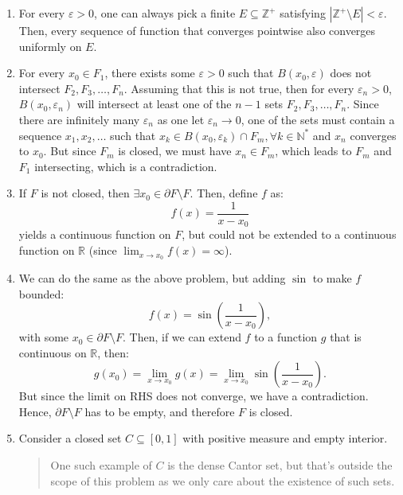 \begin{enumerate}[label=\textbf{2E.\arabic*}]
\item For every \( \varepsilon > 0 \), one can always pick a finite \( E
  \subseteq \mathbb{Z}^{+} \) satisfying \( |\mathbb{Z}^{+} \setminus E| <
  \varepsilon \). Then, every sequence of function that converges pointwise also
  converges uniformly on \( E \).
\item For every \( x_{0} \in F_{1} \), there exists some \( \varepsilon > 0 \)
  such that \( B(x_{0}, \varepsilon) \) does not intersect \( F_{2}, F_{3},
  \ldots , F_{n} \). Assuming that this is not true, then for every \(
  \varepsilon_{n} > 0 \), \( B(x_{0}, \varepsilon_{n}) \) will intersect at
  least one of the \( n-1 \) sets \( F_{2}, F_{3}, \ldots , F_{n} \). Since
  there are infinitely many \( \varepsilon_{n} \) as one let \( \varepsilon_{n}
  \to 0\), one of the sets must contain a sequence \( x_{1}, x_{2}, \ldots  \)
  such that \( x_{k} \in B(x_{0}, \varepsilon_{k}) \cap F_{m}, \forall  k \in
  \mathbb{N}^{*} \) and \( x_{n} \) converges to \( x_{0} \). But since \( F_{m}
  \) is closed, we must have \( x_{n} \in F_{m} \), which leads to \( F_{m} \)
  and \( F_{1} \) intersecting, which is a contradiction.
\item If \( F \) is not closed, then \( \exists x_{0} \in \partial F \setminus F
  \). Then, define \( f \) as:
  \[
    f(x) = \frac{1}{x - x_{0}}
  \] yields a continuous function on \( F \), but could not be extended to a
  continuous function on \( \mathbb{R} \) (since \( \lim_{x \to x_{0}}
  f(x)=\infty \)).

\item We can do the same as the above problem, but adding \( \sin \) to make \(
  f\) bounded:
  \[
    f(x) = \sin \left( \frac{1}{x - x_{0}} \right) 
  ,\] with some \( x_{0} \in \partial  F \setminus F \).
  Then, if we can extend \( f \) to a function \( g \) that is continuous on \(
  \mathbb{R}\), then:
  \[
    g(x_{0}) = \lim_{x \to x_{0}} g(x) = \lim_{x \to x_{0}} \sin \left(
    \frac{1}{x - x_{0}} \right) 
  .\] 
  But since the limit on RHS does not converge, we have a contradiction. Hence,
  \( \partial  F \setminus F \) has to be empty, and therefore \( F \) is
  closed.

\item \label{2E12}
  Consider a closed set \( C \subseteq [0, 1] \) with positive measure and empty
  interior. 
  \begin{quote}
  One such example of \(
  C\) is the dense Cantor set, but that's outside the scope of this problem as we
  only care about the existence of such sets.
  \end{quote}


\end{enumerate}
